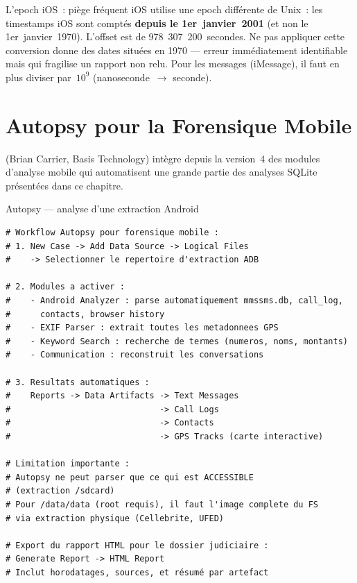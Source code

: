 \begin{boiteRemarque}{L'epoch iOS~: piège fréquent}
iOS utilise une epoch différente de Unix~: les timestamps iOS sont
comptés \textbf{depuis le 1er~janvier~2001} (et non le
1er~janvier~1970). L'offset est de 978~307~200~secondes.
Ne pas appliquer cette conversion donne des dates situées en 1970 ---
erreur immédiatement identifiable mais qui fragilise un rapport non relu.
Pour les messages (iMessage), il faut en plus diviser par~$10^9$
(nanoseconde~$\to$ seconde).
\end{boiteRemarque}

\section{Autopsy pour la Forensique Mobile}
\label{sec:autopsy-mobile}

 (Brian Carrier, Basis Technology)
intègre depuis la version~4 des modules d'analyse mobile qui automatisent
une grande partie des analyses SQLite présentées dans ce chapitre.

\begin{boxoutils}{Autopsy --- analyse d'une extraction Android}
\begin{lstlisting}[language=bash_forensique]
# Workflow Autopsy pour forensique mobile :
# 1. New Case -> Add Data Source -> Logical Files
#    -> Selectionner le repertoire d'extraction ADB

# 2. Modules a activer :
#    - Android Analyzer : parse automatiquement mmssms.db, call_log,
#      contacts, browser history
#    - EXIF Parser : extrait toutes les metadonnees GPS
#    - Keyword Search : recherche de termes (numeros, noms, montants)
#    - Communication : reconstruit les conversations

# 3. Resultats automatiques :
#    Reports -> Data Artifacts -> Text Messages
#                              -> Call Logs
#                              -> Contacts
#                              -> GPS Tracks (carte interactive)

# Limitation importante :
# Autopsy ne peut parser que ce qui est ACCESSIBLE
# (extraction /sdcard)
# Pour /data/data (root requis), il faut l'image complete du FS
# via extraction physique (Cellebrite, UFED)

# Export du rapport HTML pour le dossier judiciaire :
# Generate Report -> HTML Report
# Inclut horodatages, sources, et résumé par artefact
\end{lstlisting}
\end{boxoutils}

